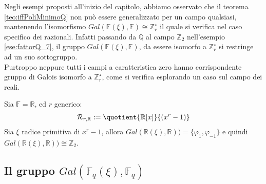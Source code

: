 Negli esempi proposti all'inizio del capitolo, abbiamo osservato che il teorema \ref{teo:iffPoliMinimoQ} non può essere generalizzato per un campo qualsiasi, mantenendo l'isomorfismo $Gal(\mathbb{F}(\xi), \mathbb{F}) \cong  \mathbb{Z}_{r}^{\star}$ il quale si verifica nel caso specifico dei razionali. Infatti passando da $\mathbb{Q}$ al campo $\mathbb{Z}_{2}$ nell'esempio \ref{ese:fattorQ_7}, il gruppo $Gal(\mathbb{F}(\xi), \mathbb{F})$, da essere isomorfo a $\mathbb{Z}_{r}^{\star}$ si restringe ad un suo sottogruppo. \\
Purtroppo neppure tutti i campi a caratteristica zero hanno corrispondente gruppo di Galois isomorfo a $\mathbb{Z}_{r}^{\star}$, come si verifica esplorando un caso sul campo dei reali.
\begin{esempio}
Sia $\mathbb{F}=\mathbb{R}$, ed $r$ generico:
\begin{align*}
  \mathcal{R}_{r, \mathbb{R}}
       := \quotient{\mathbb{R} \lbrack x \rbrack  }{(x^{r} - 1)}
\end{align*}
Sia $\xi$ radice primitiva di $x^r-1$, allora $Gal(\mathbb{R}(\xi), \mathbb{R})) = \lbrace \varphi_{1}, \varphi_{-1} \rbrace $ e quindi $Gal(\mathbb{R}(\xi), \mathbb{R})) \cong \mathbb{Z}_{2}$.
\end{esempio}

\subsection{Il gruppo $Gal(\mathbb{F}_{q}(\xi), \mathbb{F}_{q})$} \label{cap2:Gfiniti}

